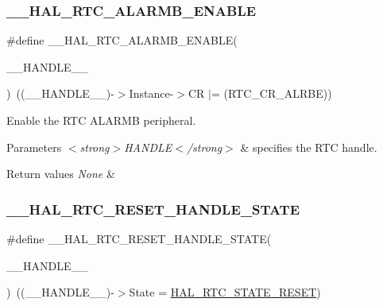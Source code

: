 \subsubsection{\texorpdfstring{\+\_\+\+\_\+\+H\+A\+L\+\_\+\+R\+T\+C\+\_\+\+A\+L\+A\+R\+M\+B\+\_\+\+E\+N\+A\+B\+LE}{\_\_HAL\_RTC\_ALARMB\_ENABLE}}
{\footnotesize\ttfamily \#define \+\_\+\+\_\+\+H\+A\+L\+\_\+\+R\+T\+C\+\_\+\+A\+L\+A\+R\+M\+B\+\_\+\+E\+N\+A\+B\+LE(\begin{DoxyParamCaption}\item[{}]{\+\_\+\+\_\+\+H\+A\+N\+D\+L\+E\+\_\+\+\_\+ }\end{DoxyParamCaption})~((\+\_\+\+\_\+\+H\+A\+N\+D\+L\+E\+\_\+\+\_\+)-\/$>$Instance-\/$>$CR $\vert$= (R\+T\+C\+\_\+\+C\+R\+\_\+\+A\+L\+R\+BE))}



Enable the R\+TC A\+L\+A\+R\+MB peripheral. 


\begin{DoxyParams}{Parameters}
{\em $<$strong$>$\+H\+A\+N\+D\+L\+E$<$/strong$>$} & specifies the R\+TC handle. \\
\hline
\end{DoxyParams}

\begin{DoxyRetVals}{Return values}
{\em None} & \\
\hline
\end{DoxyRetVals}
\mbox{\label{group___r_t_c___exported___macros_gaf20c09cfca416d79777562ccf7c994a2}} 
\subsubsection{\texorpdfstring{\+\_\+\+\_\+\+H\+A\+L\+\_\+\+R\+T\+C\+\_\+\+R\+E\+S\+E\+T\+\_\+\+H\+A\+N\+D\+L\+E\+\_\+\+S\+T\+A\+TE}{\_\_HAL\_RTC\_RESET\_HANDLE\_STATE}}
{\footnotesize\ttfamily \#define \+\_\+\+\_\+\+H\+A\+L\+\_\+\+R\+T\+C\+\_\+\+R\+E\+S\+E\+T\+\_\+\+H\+A\+N\+D\+L\+E\+\_\+\+S\+T\+A\+TE(\begin{DoxyParamCaption}\item[{}]{\+\_\+\+\_\+\+H\+A\+N\+D\+L\+E\+\_\+\+\_\+ }\end{DoxyParamCaption})~((\+\_\+\+\_\+\+H\+A\+N\+D\+L\+E\+\_\+\+\_\+)-\/$>$State = \hyperlink{group___r_t_c___exported___types_gga1e2460a2d13c4efc7a2a1ab2a1ebd32ba69cd05758f5129525749b65bee6f939f}{H\+A\+L\+\_\+\+R\+T\+C\+\_\+\+S\+T\+A\+T\+E\+\_\+\+R\+E\+S\+ET})}




